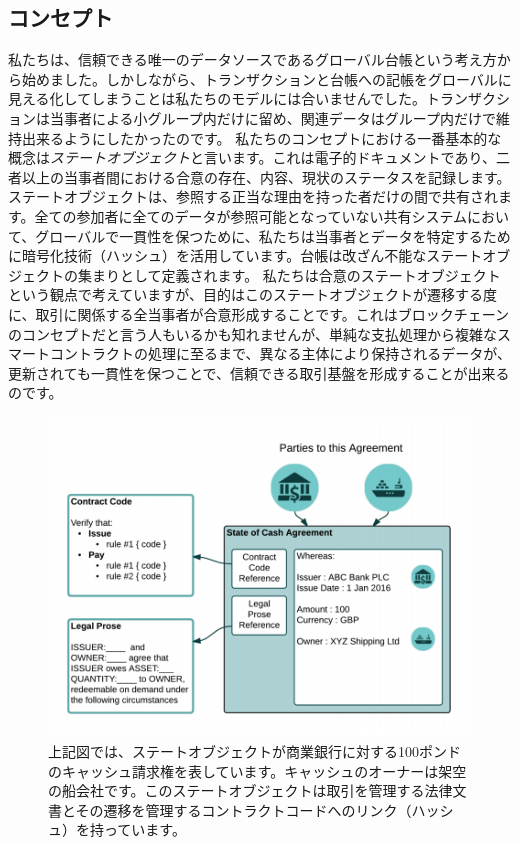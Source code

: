 \documentclass{article}
\begin{document}
\subsection{コンセプト}
私たちは、信頼できる唯一のデータソースであるグローバル台帳という考え方から始めました。しかしながら、トランザクションと台帳への記帳をグローバルに見える化してしまうことは私たちのモデルには合いませんでした。トランザクションは当事者による小グループ内だけに留め、関連データはグループ内だけで維持出来るようにしたかったのです。
私たちのコンセプトにおける一番基本的な概念は\textit{ステートオブジェクト}と言います。これは電子的ドキュメントであり、二者以上の当事者間における合意の存在、内容、現状のステータスを記録します。ステートオブジェクトは、参照する正当な理由を持った者だけの間で共有されます。全ての参加者に全てのデータが参照可能となっていない共有システムにおいて、グローバルで一貫性を保つために、私たちは当事者とデータを特定するために暗号化技術（ハッシュ）を活用しています。台帳は改ざん不能なステートオブジェクトの集まりとして定義されます。
私たちは合意のステートオブジェクトという観点で考えていますが、目的はこのステートオブジェクトが遷移する度に、取引に関係する全当事者が合意形成することです。これはブロックチェーンのコンセプトだと言う人もいるかも知れませんが、単純な支払処理から複雑なスマートコントラクトの処理に至るまで、異なる主体により保持されるデータが、更新されても一貫性を保つことで、信頼できる取引基盤を形成することが出来るのです。
\begin{figure}[H]
\includegraphics[scale = .4, center]{partiesto}
\caption{上記図では、ステートオブジェクトが商業銀行に対する100ポンドのキャッシュ請求権を表しています。キャッシュのオーナーは架空の船会社です。このステートオブジェクトは取引を管理する法律文書とその遷移を管理するコントラクトコードへのリンク（ハッシュ）を持っています。}\end{figure}
\end{document}
